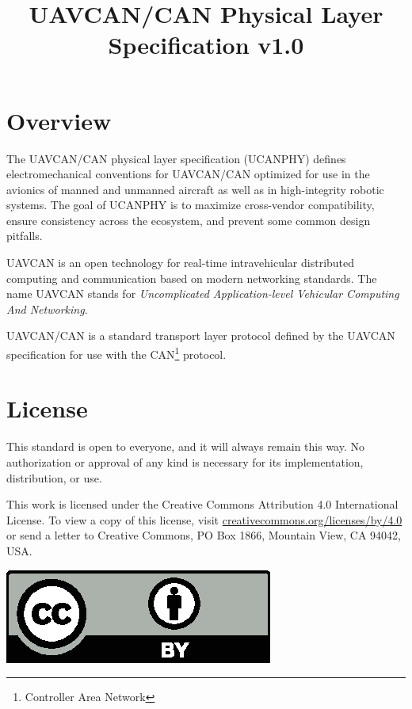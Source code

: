 \documentclass{uavcandoc}
\title{UAVCAN/CAN Physical Layer Specification v1.0}
\begin{document}
\frontmatter

\begin{titlepage}

\section*{Overview}

The UAVCAN/CAN physical layer specification (UCANPHY) defines electromechanical conventions for {UAVCAN/CAN}
optimized for use in the avionics of manned and unmanned aircraft as well as in high-integrity robotic systems.
The goal of UCANPHY is to maximize cross-vendor compatibility, ensure consistency across the ecosystem, and
prevent some common design pitfalls.

UAVCAN is an open technology for real-time intravehicular distributed computing and communication
based on modern networking standards.
The name UAVCAN stands for \emph{Uncomplicated Application-level Vehicular Computing And Networking}.

UAVCAN/CAN is a standard transport layer protocol defined by the UAVCAN specification for use with
the CAN\footnote{Controller Area Network} protocol.

\BeginRightColumn

\section*{License}

This standard is open to everyone, and it will always remain this way.
No authorization or approval of any kind is necessary for its implementation, distribution, or use.

This work is licensed under the Creative Commons Attribution 4.0 International License.
To view a copy of this license, visit
\href{http://creativecommons.org/licenses/by/4.0/}{creativecommons.org/licenses/by/4.0}
or send a letter to Creative Commons, PO Box 1866, Mountain View, CA 94042, USA.

\hspace*{\fill}\includegraphics[height=1.75\baselineskip]{cc-by}\hspace*{\fill}


\end{titlepage}
\end{document}
